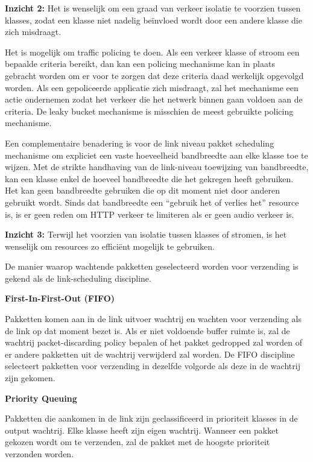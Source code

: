 \noindent \noindent\textbf{Inzicht 2:} Het is wenselijk om een graad van verkeer isolatie te voorzien tussen klasses, zodat een klasse niet nadelig beïnvloed wordt door een andere klasse die zich misdraagt.

\noindent Het is mogelijk om traffic policing te doen. Als een verkeer klasse of stroom een bepaalde criteria bereikt, dan kan een policing mechanisme kan in plaats gebracht worden om er voor te zorgen dat deze criteria daad werkelijk opgevolgd worden. Als een gepoliceerde applicatie zich misdraagt, zal het mechanisme een actie ondernemen zodat het verkeer die het netwerk binnen gaan voldoen aan de criteria. 
\noindent De leaky bucket mechanisme is misschien de meest gebruikte policing mechanisme.

\noindent Een complementaire benadering is voor de link niveau pakket scheduling mechanisme om expliciet een vaste hoeveelheid bandbreedte aan elke klasse toe te wijzen. Met de strikte handhaving van de link-niveau toewijzing van bandbreedte, kan een klasse enkel de hoeveel bandbreedte die het gekregen heeft gebruiken. Het kan geen bandbreedte gebruiken die op dit moment niet door anderen gebruikt wordt. Sinds dat bandbreedte een “gebruik het of verlies het” resource is, is er geen reden om HTTP verkeer te limiteren als er geen audio verkeer is.

\noindent \textbf{Inzicht 3:} Terwijl het voorzien van isolatie tussen klasses of stromen, is het wenselijk om resources zo efficiënt mogelijk te gebruiken.




\noindent De manier waarop wachtende pakketten geselecteerd worden voor verzending is gekend als de link-scheduling discipline.

\noindent \textbf{First-In-First-Out (FIFO)}

\noindent Pakketten komen aan in de link uitvoer wachtrij en wachten voor verzending als de link op dat moment bezet is. Als er niet voldoende buffer ruimte is, zal de wachtrij packet-discarding policy bepalen of het pakket gedropped zal worden of er andere pakketten uit de wachtrij verwijderd zal worden.
De FIFO discipline selecteert pakketten voor verzending in dezelfde volgorde als deze in de wachtrij zijn gekomen.

\textbf{Priority Queuing}

Pakketten die aankomen in de link zijn geclassificeerd in prioriteit klasses in de output wachtrij. Elke klasse heeft zijn eigen wachtrij. Wanneer een pakket gekozen wordt om te verzenden, zal de pakket met de hoogste prioriteit verzonden worden.

